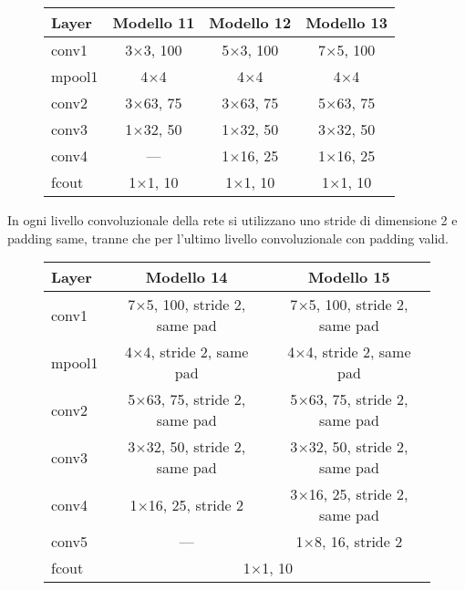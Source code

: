 \begin{figure}[H]
	\centering
	\begin{tabular}{lccc}
		\toprule
		\textbf{Layer} & \textbf{Modello 11} & \textbf{Modello 12} & \textbf{Modello 13}  	\\ 
		\midrule
		conv1 	& \num{3}$\times$\num{3}, 100	  & \num{5}$\times$\num{3}, 100 & \num{7}$\times$\num{5}, 100 	   \\
		mpool1 	& {\num{4}$\times$\num{4}}	&{\num{4}$\times$\num{4}}	& {\num{4}$\times$\num{4}}	 \\
		conv2  	& \num{3}$\times$\num{63}, 75 &  \num{3}$\times$\num{63}, 75	  &		\num{5}$\times$\num{63}, 75    \\
		conv3  	&\num{1}$\times$\num{32}, 50	  & \num{1}$\times$\num{32}, 50  &	\num{3}$\times$\num{32}, 50 	  \\
		conv4  	& ---	  & \num{1}$\times$\num{16}, 25  &	\num{1}$\times$\num{16}, 25 	  \\
		fcout	&{\num{1}$\times$\num{1}, 10} &{\num{1}$\times$\num{1}, 10}&{\num{1}$\times$\num{1}, 10}		   \\
		\bottomrule	
	\end{tabular}
	\label{tab:netemb4}
\end{figure}

In ogni livello convoluzionale della rete si utilizzano uno stride di dimensione 2 e padding same, tranne che per l'ultimo livello convoluzionale con padding valid.

\begin{figure}[H]
	\centering
	\begin{tabular}{lcc}
		\toprule
		\textbf{Layer} & \textbf{Modello 14} & \textbf{Modello 15}   	\\ 
		\midrule
		conv1 	& {\num{7}$\times$\num{5}, 100, stride 2, same pad}&{\num{7}$\times$\num{5}, 100, stride 2, same pad} \\
		mpool1 	& {\num{4}$\times$\num{4}, stride 2, same pad} &{\num{4}$\times$\num{4}, stride 2, same pad}  \\
		conv2  	& {\num{5}$\times$\num{63}, 75, stride 2, same pad}&{\num{5}$\times$\num{63}, 75, stride 2, same pad}    \\
		conv3  	&  {\num{3}$\times$\num{32}, 50, stride 2, same pad} &{\num{3}$\times$\num{32}, 50, stride 2, same pad} 	  \\
		conv4  	& \num{1}$\times$\num{16}, 25, stride 2  &	\num{3}$\times$\num{16}, 25, stride 2, same pad 	  \\
		conv5  	& ---  &	\num{1}$\times$\num{8}, 16, stride 2 	  \\
		fcout	& \multicolumn{2}{c}{\num{1}$\times$\num{1}, 10}		   \\
		\bottomrule	
	\end{tabular}
	\label{tab:rmsebin2}
\end{figure}

